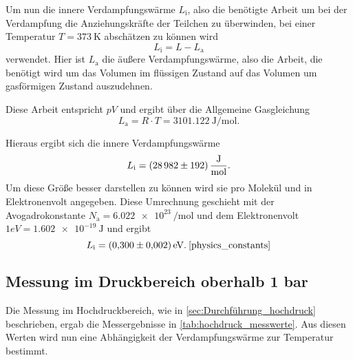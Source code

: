 Um nun die innere Verdampfungswärme $L_\text{i}$, also die benötigte Arbeit um bei der Verdampfung die Anziehungskräfte der Teilchen zu überwinden, bei einer Temperatur $T=\SI{373}{\kelvin}$ abschätzen zu können wird
\begin{equation}
    L_\text{i} = L - L_\text{a}
\end{equation}
verwendet. 
Hier ist $L_\text{a}$ die äußere Verdampfungswärme, also die Arbeit, die benötigt wird um das Volumen im flüssigen Zustand auf das Volumen um gasförmigen Zustand auszudehnen.\cite{V203}

Diese Arbeit entspricht $pV$ und ergibt über die Allgemeine Gasgleichung
\begin{equation*}
    L_\text{a} = R \cdot T = \SI{3101.122}{\joule\per\mol}.
\end{equation*}

Hieraus ergibt sich die innere Verdampfungswärme
\begin{equation*}
    L_\text{i} = \SI{28982+-192}{\joule\per\mol}.
\end{equation*}
Um diese Größe besser darstellen zu können wird sie pro Molekül und in Elektronenvolt angegeben.
Diese Umrechnung geschieht mit der Avogadrokonstante $N_\text{a} = \SI{6.022e23}{\per\mol}$ und dem Elektronenvolt $1 eV = \SI{1.602e-19}{\joule}$ und ergibt
\begin{equation*}
    L_\text{i} = \SI{0.300+-0.002}{\electronvolt}. \: \text{\cite{physics_constants}}
\end{equation*}


\subsection{Messung im Druckbereich oberhalb 1 bar}
\label{sec:Auswertung_hochdruck}

Die Messung im Hochdruckbereich, wie in \autoref{sec:Durchführung_hochdruck} beschrieben, ergab die Messergebnisse in \autoref{tab:hochdruck_messwerte}.
Aus diesen Werten wird nun eine Abhängigkeit der Verdampfungswärme zur Temperatur bestimmt.

